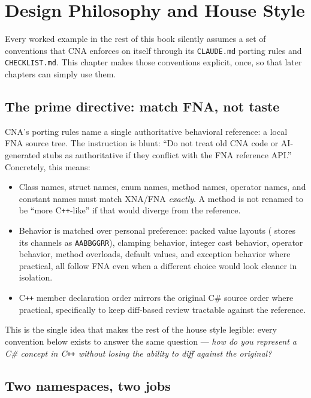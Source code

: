 \chapter{Design Philosophy and House Style}
\label{ch:design-philosophy}

Every worked example in the rest of this book silently assumes a set of conventions that CNA
enforces on itself through its \texttt{CLAUDE.md} porting rules and \texttt{CHECKLIST.md}.
This chapter makes those conventions explicit, once, so that later chapters can simply use
them.

\section{The prime directive: match FNA, not taste}

CNA's porting rules name a single authoritative behavioral reference: a local FNA source
tree. The instruction is blunt: ``Do not treat old CNA code or AI-generated stubs as
authoritative if they conflict with the FNA reference API.'' Concretely, this means:

\begin{itemize}
  \item Class names, struct names, enum names, method names, operator names, and constant
        names must match XNA/FNA \emph{exactly}. A method is not renamed to be ``more
        C\texttt{++}-like'' if that would diverge from the reference.
  \item Behavior is matched over personal preference: packed value layouts (
        stores its channels as \texttt{AABBGGRR}), clamping behavior, integer cast behavior,
        operator behavior, method overloads, default values, and exception behavior where
        practical, all follow FNA even when a different choice would look cleaner in
        isolation.
  \item C\texttt{++} member declaration order mirrors the original C\# source order where
        practical, specifically to keep diff-based review tractable against the reference.
\end{itemize}

This is the single idea that makes the rest of the house style legible: every convention
below exists to answer the same question --- \emph{how do you represent a C\# concept in
C\texttt{++} without losing the ability to diff against the original?}

\section{Two namespaces, two jobs}

